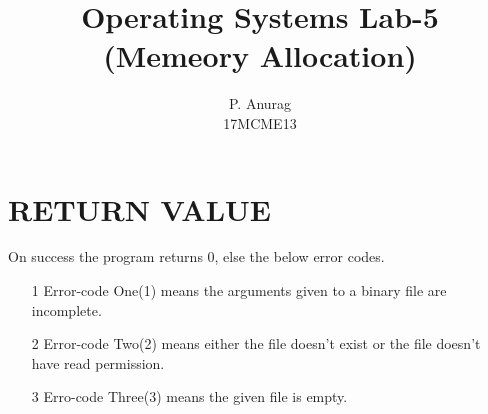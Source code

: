 \documentclass[a4paper,10pt]{article}
\title{Operating Systems Lab-5 (Memeory Allocation)}
\author{P. Anurag\\17MCME13}
\date{}
\begin{document}
\maketitle
  \section{RETURN VALUE}
    On success the program returns 0, else the below error codes.
    \begin{enumerate}
      \item[1] Error-code One(1) means the arguments given to a binary file are incomplete.
      \item[2] Error-code Two(2) means either the file doesn't exist or the file doesn't have
               read permission.
      \item[3] Erro-code Three(3) means the given file is empty.
    \end{enumerate}
\end{document}

